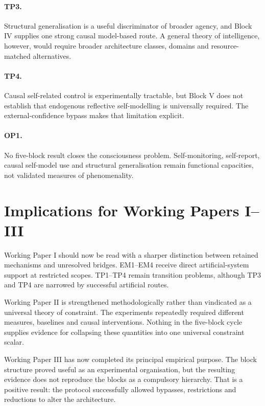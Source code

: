 \documentclass[11pt,a4paper]{article}
\begin{document}
\paragraph{TP3.} Structural generalisation is a useful discriminator of broader agency, and Block IV supplies one strong causal model-based route. A general theory of intelligence, however, would require broader architecture classes, domains and resource-matched alternatives.

\paragraph{TP4.} Causal self-related control is experimentally tractable, but Block V does not establish that endogenous reflective self-modelling is universally required. The external-confidence bypass makes that limitation explicit.

\paragraph{OP1.} No five-block result closes the consciousness problem. Self-monitoring, self-report, causal self-model use and structural generalisation remain functional capacities, not validated measures of phenomenality.

\section{Implications for Working Papers I--III}

Working Paper I should now be read with a sharper distinction between retained mechanisms and unresolved bridges. EM1--EM4 receive direct artificial-system support at restricted scopes. TP1--TP4 remain transition problems, although TP3 and TP4 are narrowed by successful artificial routes.

Working Paper II is strengthened methodologically rather than vindicated as a universal theory of constraint. The experiments repeatedly required different measures, baselines and causal interventions. Nothing in the five-block cycle supplies evidence for collapsing these quantities into one universal constraint scalar.

Working Paper III has now completed its principal empirical purpose. The block structure proved useful as an experimental organisation, but the resulting evidence does not reproduce the blocks as a compulsory hierarchy. That is a positive result: the protocol successfully allowed bypasses, restrictions and reductions to alter the architecture.
\end{document}
